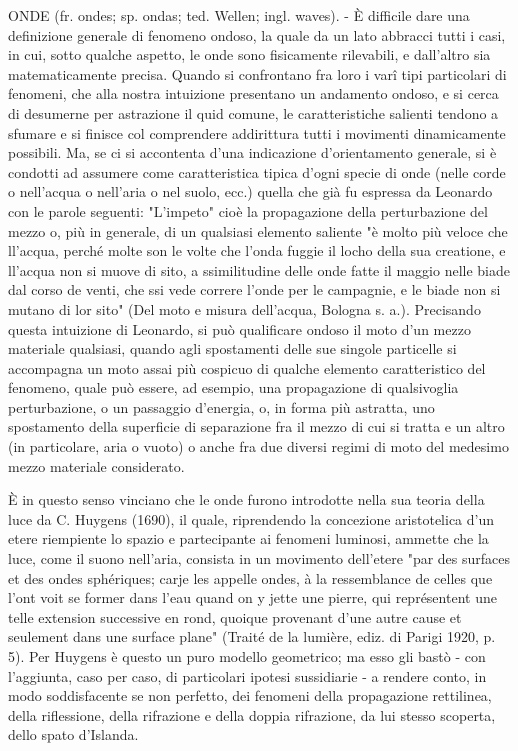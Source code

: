 \documentclass[a4paper]{article}
\begin{document}
 ONDE (fr. ondes; sp. ondas; ted. Wellen; ingl. waves). - È difficile dare una definizione generale di fenomeno ondoso, la quale da un lato abbracci tutti i casi, in cui, sotto qualche aspetto, le onde sono fisicamente rilevabili, e dall'altro sia matematicamente precisa. Quando si confrontano fra loro i varî tipi particolari di fenomeni, che alla nostra intuizione presentano un andamento ondoso, e si cerca di desumerne per astrazione il quid comune, le caratteristiche salienti tendono a sfumare e si finisce col comprendere addirittura tutti i movimenti dinamicamente possibili. Ma, se ci si accontenta d'una indicazione d'orientamento generale, si è condotti ad assumere come caratteristica tipica d'ogni specie di onde (nelle corde o nell'acqua o nell'aria o nel suolo, ecc.) quella che già fu espressa da Leonardo con le parole seguenti: "L'impeto" cioè la propagazione della perturbazione del mezzo o, più in generale, di un qualsiasi elemento saliente "è molto più veloce che ll'acqua, perché molte son le volte che l'onda fuggie il locho della sua creatione, e ll'acqua non si muove di sito, a ssimilitudine delle onde fatte il maggio nelle biade dal corso de venti, che ssi vede correre l'onde per le campagnie, e le biade non si mutano di lor sito" (Del moto e misura dell'acqua, Bologna s. a.). Precisando questa intuizione di Leonardo, si può qualificare ondoso il moto d'un mezzo materiale qualsiasi, quando agli spostamenti delle sue singole particelle si accompagna un moto assai più cospicuo di qualche elemento caratteristico del fenomeno, quale può essere, ad esempio, una propagazione di qualsivoglia perturbazione, o un passaggio d'energia, o, in forma più astratta, uno spostamento della superficie di separazione fra il mezzo di cui si tratta e un altro (in particolare, aria o vuoto) o anche fra due diversi regimi di moto del medesimo mezzo materiale considerato.

È in questo senso vinciano che le onde furono introdotte nella sua teoria della luce da C. Huygens (1690), il quale, riprendendo la concezione aristotelica d'un etere riempiente lo spazio e partecipante ai fenomeni luminosi, ammette che la luce, come il suono nell'aria, consista in un movimento dell'etere "par des surfaces et des ondes sphériques; carje les appelle ondes, à la ressemblance de celles que l'ont voit se former dans l'eau quand on y jette une pierre, qui représentent une telle extension successive en rond, quoique provenant d'une autre cause et seulement dans une surface plane" (Traité de la lumière, ediz. di Parigi 1920, p. 5). Per Huygens è questo un puro modello geometrico; ma esso gli bastò - con l'aggiunta, caso per caso, di particolari ipotesi sussidiarie - a rendere conto, in modo soddisfacente se non perfetto, dei fenomeni della propagazione rettilinea, della riflessione, della rifrazione e della doppia rifrazione, da lui stesso scoperta, dello spato d'Islanda.
\end{document}
